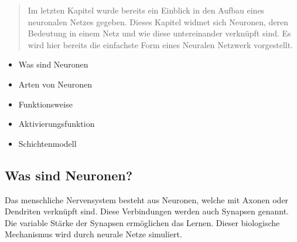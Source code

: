 \begin{tcolorbox}[title={Inhalt}]
    \begin{quotation}\noindent
        Im letzten Kapitel wurde bereits ein Einblick in den Aufbau eines neuronalen Netzes gegeben. 
        Dieses Kapitel widmet sich Neuronen, deren Bedeutung in einem Netz und wie diese untereinander verknüpft sind.
        Es wird hier bereits die einfachste Form eines Neuralen Netzwerk vorgestellt.
    \end{quotation}
\begin{itemize} 
    \item Was sind Neuronen
    \item Arten von Neuronen
    \item Funktionsweise
    \item Aktivierungsfunktion
    \item Schichtenmodell
\end{itemize} 
\end{tcolorbox}
\subsection{Was sind Neuronen?}\label{sec:neuronen:was_sind_neuronen}  
Das menschliche Nervensystem besteht aus Neuronen, welche mit Axonen oder Dendriten verknüpft sind. Diese Verbindungen werden auch Synapsen genannt. Die variable Stärke der Synapsen
ermöglichen das Lernen. Dieser biologische Mechanismus wird durch neurale Netze simuliert.\\


